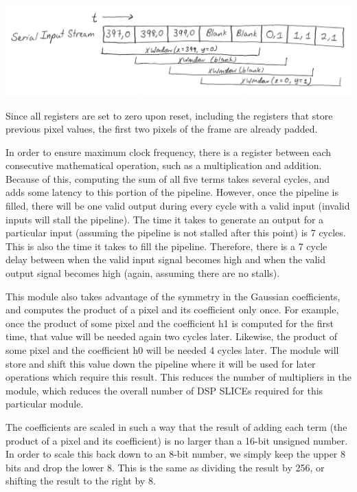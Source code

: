 \documentclass[12pt]{article}
\begin{document}
\includegraphics[width=\textwidth]{processed_image_pngs/serial_input.png}

Since all registers are set to 
zero upon reset, including the registers that store previous pixel values, the 
first two pixels of the frame are already padded.

In order to ensure maximum clock frequency, there is a register between each 
consecutive mathematical operation, such as a multiplication and addition. 
Because of this, computing the sum of all five terms takes several cycles, and 
adds some latency to this portion of the pipeline. However, once the pipeline is 
filled, there will be one valid output during every cycle with a valid input 
(invalid inputs will stall the pipeline). The time it takes to generate an 
output for a particular input (assuming the pipeline is not stalled after this 
point) is 7 cycles. This is also the time it takes to fill the pipeline. 
Therefore, there is a 7 cycle delay between when the valid input signal becomes 
high and when the valid output signal becomes high (again, assuming there are no 
stalls).

This module also takes advantage of the symmetry in the Gaussian coefficients, 
and computes the product of a pixel and its coefficient only once. For example, 
once the product of some pixel and the coefficient h1 is computed for the first 
time, that value will be needed again two cycles later. Likewise, the product of 
some pixel and the coefficient h0 will be needed 4 cycles later. The module will 
store and shift this value down the pipeline where it will be used for later 
operations which require this result. This reduces the number of multipliers in 
the module, which reduces the overall number of DSP SLICEs required for this 
particular module.

The coefficients are scaled in such a way that the result of adding each term 
(the product of a pixel and its coefficient) is no larger than a 16-bit unsigned 
number. In order to scale this back down to an 8-bit number, we simply keep the 
upper 8 bits and drop the lower 8. This is the same as dividing the result by 
256, or shifting the result to the right by 8.
\end{document}
